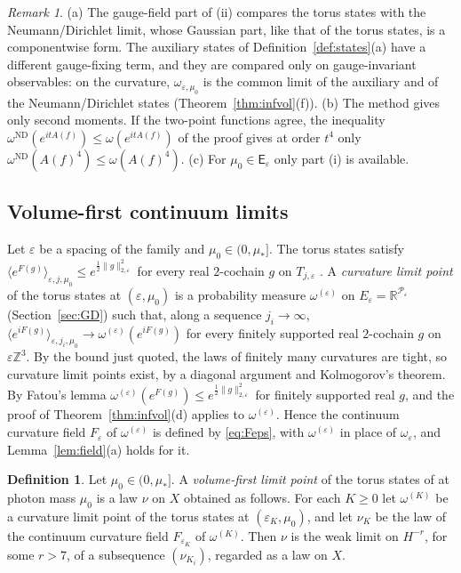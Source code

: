 \documentclass[11pt]{amsart}
\theoremstyle{plain}
\theoremstyle{definition}
\newtheorem{definition}[theorem]{Definition}
\theoremstyle{remark}
\newtheorem{remark}[theorem]{Remark}
\numberwithin{equation}{section}
\newcommand{\R}{\mathbb{R}}
\newcommand{\Z}{\mathbb{Z}}
\newcommand{\eps}{\varepsilon}
\newcommand{\cP}{\mathcal{P}}
\newcommand{\norm}[1]{\lVert #1\rVert}
\newcommand{\ev}[1]{\langle #1\rangle}
\begin{document}
\begin{remark}\label{rem:torus2pt}
(a) The gauge-field part of (ii) compares the torus states with the Neumann/Dirichlet limit, whose Gaussian part, like that of the torus states, is a componentwise form. The auxiliary states of Definition~\ref{def:states}(a) have a different gauge-fixing term, and they are compared only on gauge-invariant observables: on the curvature, $\omega_{\eps,\mu_0}$ is the common limit of the auxiliary and of the Neumann/Dirichlet states (Theorem~\ref{thm:infvol}(f)).
(b) The method gives only second moments. If the two-point functions agree, the inequality $\omega^{\mathrm{ND}}(e^{itA(f)})\le\omega(e^{itA(f)})$ of the proof gives at order $t^4$ only $\omega^{\mathrm{ND}}(A(f)^4)\le\omega(A(f)^4)$.
(c) For $\mu_0\in\mathsf E_\eps$ only part (i) is available.
\end{remark}

\subsection{Volume-first continuum limits}
Let $\eps$ be a spacing of the family and $\mu_0\in(0,\mu_*]$. The torus states satisfy $\ev{e^{F(g)}}_{\eps,j,\mu_0}\le e^{\frac12\norm g^2_{2,\eps}}$ for every real $2$-cochain $g$ on $T_{j,\eps}$ \cite[Lemma~7.3]{v1}. A \emph{curvature limit point} of the torus states at $(\eps,\mu_0)$ is a probability measure $\omega^{(\eps)}$ on $E_\eps=\R^{\cP_\eps}$ (Section~\ref{sec:GD}) such that, along a sequence $j_i\to\infty$, $\ev{e^{iF(g)}}_{\eps,j_i,\mu_0}\to\omega^{(\eps)}(e^{iF(g)})$ for every finitely supported real $2$-cochain $g$ on $\eps\Z^3$. By the bound just quoted, the laws of finitely many curvatures are tight, so curvature limit points exist, by a diagonal argument and Kolmogorov's theorem. By Fatou's lemma $\omega^{(\eps)}(e^{F(g)})\le e^{\frac12\norm g^2_{2,\eps}}$ for finitely supported real $g$, and the proof of Theorem~\ref{thm:infvol}(d) applies to $\omega^{(\eps)}$. Hence the continuum curvature field $F_\eps$ of $\omega^{(\eps)}$ is defined by \eqref{eq:Feps}, with $\omega^{(\eps)}$ in place of $\omega_\eps$, and Lemma~\ref{lem:field}(a) holds for it.

\begin{definition}\label{def:vf}
Let $\mu_0\in(0,\mu_*]$. A \emph{volume-first limit point} of the torus states of \cite{v1} at photon mass $\mu_0$ is a law $\nu$ on $X$ obtained as follows. For each $K\ge0$ let $\omega^{(K)}$ be a curvature limit point of the torus states at $(\eps_K,\mu_0)$, and let $\nu_K$ be the law of the continuum curvature field $F_{\eps_K}$ of $\omega^{(K)}$. Then $\nu$ is the weak limit on $H^{-r}$, for some $r>7$, of a subsequence $(\nu_{K_i})$, regarded as a law on $X$.
\end{definition}
\end{document}
